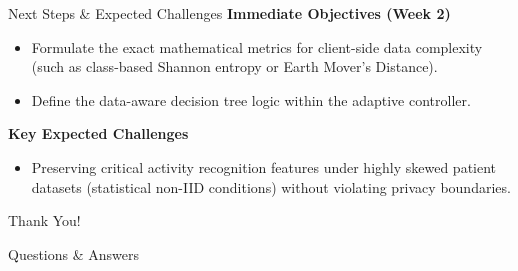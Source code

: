 \documentclass[10pt, aspectratio=169]{beamer}
\begin{document}
\begin{frame}{Next Steps \& Expected Challenges}
    \textbf{Immediate Objectives (Week 2)}
    \begin{itemize}
        \item Formulate the exact mathematical metrics for client-side data complexity (such as class-based Shannon entropy or Earth Mover's Distance).
        \item Define the data-aware decision tree logic within the adaptive controller.
    \end{itemize}

    \vspace{0.3cm}
    \textbf{Key Expected Challenges}
    \begin{itemize}
        \item Preserving critical activity recognition features under highly skewed patient datasets (statistical non-IID conditions) without violating privacy boundaries.
    \end{itemize}
\end{frame}

\begin{frame}[standout]
    Thank You!
    \vspace{0.5cm}

    \begin{center}
        \large Questions \& Answers
    \end{center}
\end{frame}
\end{document}
